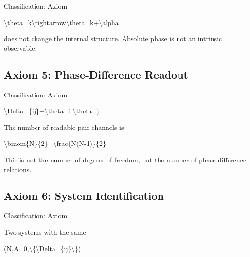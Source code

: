 \documentclass[
  a4paper]{article}
\newenvironment{Shaded}{}{}
\newcommand{\NormalTok}[1]{#1}
\begin{document}
Classification: Axiom

\begin{Shaded}
\begin{Highlighting}[]
\NormalTok{\textbackslash{}theta\_k\textbackslash{}rightarrow\textbackslash{}theta\_k+\textbackslash{}alpha}
\end{Highlighting}
\end{Shaded}

does not change the internal structure. Absolute phase is not an
intrinsic observable.

\subsection{Axiom 5: Phase-Difference
Readout}\label{axiom-5-phase-difference-readout}

Classification: Axiom

\begin{Shaded}
\begin{Highlighting}[]
\NormalTok{\textbackslash{}Delta\_\{ij\}=\textbackslash{}theta\_i{-}\textbackslash{}theta\_j}
\end{Highlighting}
\end{Shaded}

The number of readable pair channels is

\begin{Shaded}
\begin{Highlighting}[]
\NormalTok{\textbackslash{}binom\{N\}\{2\}=\textbackslash{}frac\{N(N{-}1)\}\{2\}}
\end{Highlighting}
\end{Shaded}

This is not the number of degrees of freedom, but the number of
phase-difference relations.

\subsection{Axiom 6: System
Identification}\label{axiom-6-system-identification}

Classification: Axiom

Two systems with the same

\begin{Shaded}
\begin{Highlighting}[]
\NormalTok{(N,A\_0,\textbackslash{}\{\textbackslash{}Delta\_\{ij\}\textbackslash{}\})}
\end{Highlighting}
\end{Shaded}
\end{document}
